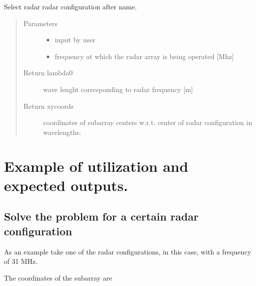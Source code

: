 \documentclass[letterpaper,10pt,english]{sphinxmanual}
\begin{document}
\begin{fulllineitems}
\label{\detokenize{radarconf:radarconf.radar_conf}}
Select radar radar configuration after name.
\begin{quote}\begin{description}
\item[{Parameters}] \leavevmode\begin{itemize}
\item {} 
 \textendash{} input by user

\item {} 
 \textendash{} frequency at which the radar array is being operated {[}Mhz{]}

\end{itemize}

\item[{Return lambda0}] \leavevmode
wave lenght corresponding to radar frequency {[}m{]}

\item[{Return xycoords}] \leavevmode
coordinates of subarray centers w.r.t. center of radar configuration in wavelengths.

\end{description}\end{quote}

\end{fulllineitems}



\chapter{Example of utilization and expected outputs.}
\label{\detokenize{test_example:example-of-utilization-and-expected-outputs}}\label{\detokenize{test_example::doc}}

\section{Solve the problem for a certain radar configuration}
\label{\detokenize{test_example:solve-the-problem-for-a-certain-radar-configuration}}
As an example take one of the radar configurations,  in this case, with a frequency of 31 MHz.

The coordinates of the subarray are
\end{document}
